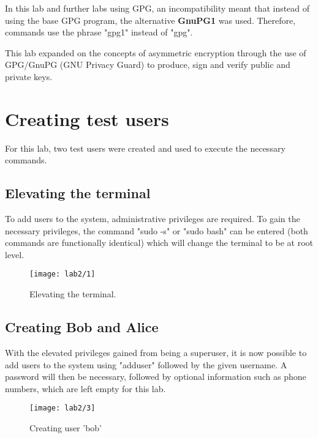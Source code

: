 \begin{tcolorbox}[colback=red!5!white,colframe=red!75!black,title=Important note]
    In this lab and further labs using GPG, an incompatibility meant that instead
    of using the base GPG program, the alternative \textbf{GnuPG1} was used.
    Therefore, commands use the phrase "gpg1" instead of "gpg".
\end{tcolorbox}

This lab expanded on the concepts of asymmetric encryption through the use of\newline
GPG/GnuPG (GNU Privacy Guard) to produce, sign and verify public and private keys.\\

\section{Creating test users}\label{sec:testUsers}
For this lab, two test users were created and used to execute the necessary commands.

\subsection{Elevating the terminal}\label{subsec:sudo}
To add users to the system, administrative privileges are required.
To gain the necessary privileges, the command "sudo -s" or "sudo bash" can be entered
(both commands are functionally identical) which will change the terminal to be at root level.

\begin{figure}[H]
    \centering
    \texttt{[image: lab2/1]}
    \caption{Elevating the terminal.}
    \label{fig:sudo}
\end{figure}

\subsection{Creating Bob and Alice}\label{subsec:createUsers}
With the elevated privileges gained from being a superuser, it is now possible to add users to the system using
"adduser" followed by the given username.
A password will then be necessary, followed by optional information such as phone numbers, which are left empty
for this lab.

\begin{figure}[H]
    \centering
    \texttt{[image: lab2/3]}
    \caption{Creating user 'bob'}
    \label{fig:createBob}
\end{figure}

